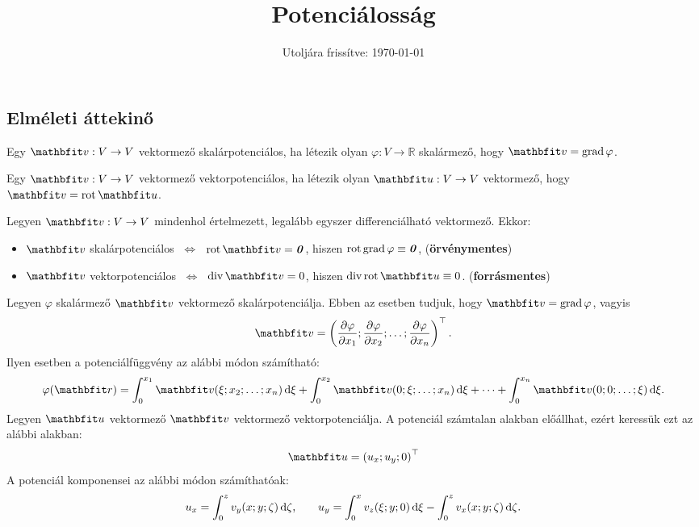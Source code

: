 \documentclass{szb-practice}
\title{Potenciálosság}
\date{Utoljára frissítve: \today}
\begin{document}
\allowdisplaybreaks

\maketitle

\vspace{-1em}

\subsection{Elméleti áttekinő}

\begin{definition}[Skalárpotenciálosság]
  Egy $\rvec v: V \rightarrow V$ vektormező skalárpotenciálos, ha létezik olyan
  $\varphi: V \rightarrow \mathbb R$ skalármező, hogy $\rvec v = \grad \varphi$.
\end{definition}

\begin{definition}[Vektorpotenciálosság]
  Egy $\rvec v: V \rightarrow V$ vektormező vektorpotenciálos, ha létezik olyan
  $\rvec u: V \rightarrow V$ vektormező, hogy $\rvec v = \rot \rvec u$.
\end{definition}

\begin{theorem}
  Legyen $\rvec v: V \rightarrow V$ mindenhol értelmezett, legalább egyszer
  differenciálható vektormező. Ekkor:
  \begin{itemize}
    \item $\rvec v$ skalárpotenciálos
          $\;\Leftrightarrow\;$
          $\rot \rvec v = \nvec$,
          hiszen $\operatorname{rot} \operatorname{grad} \varphi \equiv \text{\textbf{\textit{0}}}$,
          \hfill (\textbf{örvénymentes})
    \item $\rvec v$ vektorpotenciálos
          $\;\Leftrightarrow\;$
          $\Div \rvec v = 0$,
          hiszen $\Div \rot \rvec u \equiv 0$.
          \hfill (\textbf{forrásmentes})
  \end{itemize}
\end{theorem}

\begin{blueBox}[][nobreak]

  Legyen $\varphi$ skalármező $\rvec v$ vektormező skalárpotenciálja. Ebben
  az esetben tudjuk, hogy $\rvec v = \grad \varphi$, vagyis
  \[
    \rvec v = \left(
    \pdv{\varphi}{x_1};
    \pdv{\varphi}{x_2};
    \dots;
    \pdv{\varphi}{x_n}
    \right)^\T
    \text.
  \]
  Ilyen esetben a potenciálfüggvény az alábbi módon számítható:
  \[
    \varphi (\rvec r)
    = \int_0^{x_1} \rvec v(\xi; x_2; \dots; x_n) \dd \xi
    + \int_0^{x_2} \rvec v(0; \xi; \dots; x_n) \dd \xi
    + \dots
    + \int_0^{x_n} \rvec v(0; 0; \dots; \xi) \dd \xi
    \text.
  \]
  Legyen $\rvec u$ vektormező $\rvec v$ vektormező vektorpotenciálja.
  A potenciál számtalan alakban előállhat, ezért keressük ezt az alábbi alakban:
  \[
    \rvec u = \left( u_x; u_y; 0 \right)^\T
  \]
  A potenciál komponensei az alábbi módon számíthatóak:
  \[
    u_x = \int_0^z v_y(x; y; \zeta) \mathop{}\!\mathrm{d} \zeta
    \text,
    \qquad
    u_y = \int_0^x v_z(\xi; y; 0) \mathop{}\!\mathrm{d} \xi
    - \int_0^z v_x(x; y; \zeta) \mathop{}\!\mathrm{d} \zeta
    \text.
  \]
\end{blueBox}
\end{document}
